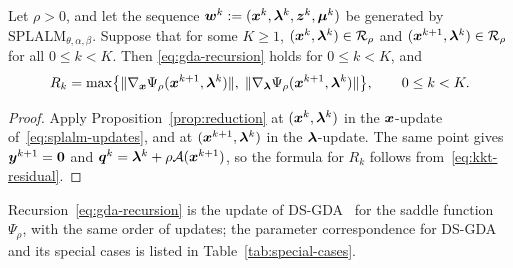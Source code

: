 \begin{proposition}[Embedding]
\label{prop:embedding}
Let \(\rho>0\), and let the sequence
\(\bm{w}^k:=(\bm{x}^k,\bm{\lambda}^k,\bm{z}^k,\bm{\mu}^k)\) be generated by
\(\mathrm{SPLALM}_{\theta,\alpha,\beta}\). Suppose that for some \(K\ge1\),
\((\bm{x}^k,\bm{\lambda}^k)\in\mathcal R_\rho\) and
\((\bm{x}^{k+1},\bm{\lambda}^k)\in\mathcal R_\rho\) for all \(0\le k<K\).
Then \eqref{eq:gda-recursion} holds for \(0\le k<K\), and
\[
R_k=\max\bigl\{\|\nabla_{\bm{x}}\Psi_\rho(\bm{x}^{k+1},\bm{\lambda}^k)\|,\;
\|\nabla_{\bm{\lambda}}\Psi_\rho(\bm{x}^{k+1},\bm{\lambda}^k)\|\bigr\},
\qquad 0\le k<K.
\]
\end{proposition}

\begin{proof}
Apply Proposition~\ref{prop:reduction} at \((\bm{x}^k,\bm{\lambda}^k)\) in the
\(\bm{x}\)-update of~\eqref{eq:splalm-updates}, and at \((\bm{x}^{k+1},\bm{\lambda}^k)\) in
the \(\bm{\lambda}\)-update. The same point gives \(\bm{y}^{k+1}=\bm{0}\) and
\(\bm{q}^k=\bm{\lambda}^k+\rho\mathcal{A}(\bm{x}^{k+1})\), so the formula for \(R_k\) follows
from~\eqref{eq:kkt-residual}.
\end{proof}

Recursion~\eqref{eq:gda-recursion} is the update of
DS-GDA~\cite{zheng2023universal} for the saddle function \(\Psi_\rho\), with
the same order of updates; the parameter correspondence for DS-GDA and its
special cases is listed in Table~\ref{tab:special-cases}.

